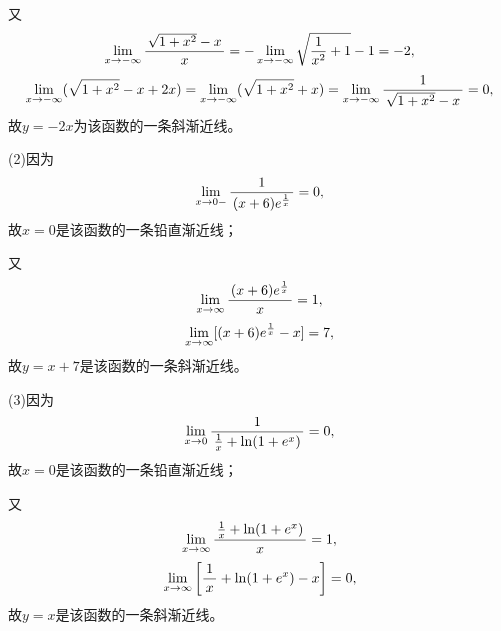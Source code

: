 又
$$\limx{-\infty}\df{\sqrt{1+x^2}-x}x
=-\limx{-\infty}\sqrt{\frac1{x^2}+1}-1=-2,$$
$$\limx{-\infty}(\sqrt{1+x^2}-x+2x)
=\limx{-\infty}(\sqrt{1+x^2}+x)
=\limx{-\infty}\df{1}{\sqrt{1+x^2}-x}=0,$$
故$y=-2x$为该函数的一条斜渐近线。

(2)因为
$$\limx{0-}\df1{(x+6)e^{\frac1x}}=0,$$
故$x=0$是该函数的一条铅直渐近线；

又
$$\limx{\infty}\df{(x+6)e^{\frac1x}}x=1,$$
$$\limx{\infty}[(x+6)e^{\frac1x}-x]=7,$$
故$y=x+7$是该函数的一条斜渐近线。

(3)因为
$$\limx0\df1{\frac1x+\ln(1+e^x)}=0,$$
故$x=0$是该函数的一条铅直渐近线；

又
$$\limx{\infty}\df{\frac1x+\ln(1+e^x)}x=1,$$
$$\limx{\infty}\left[\df1x+\ln(1+e^x)-x\right]=0,$$
故$y=x$是该函数的一条斜渐近线。
\fin

